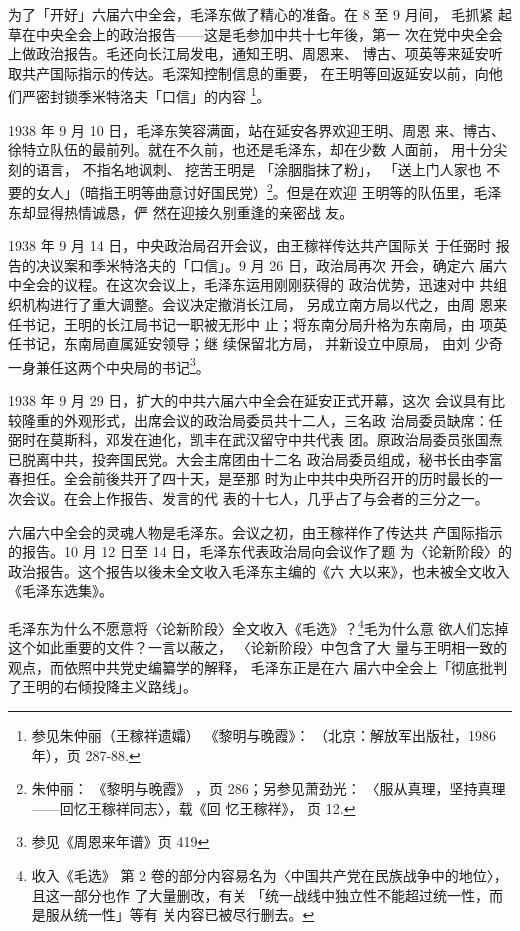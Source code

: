 为了「开好」六届六中全会，毛泽东做了精心的准备。在 8 至 9 月间， 毛抓紧
起草在中央全会上的政治报告——这是毛参加中共十七年後，第一 次在党中央全会
上做政治报告。毛还向长江局发电，通知王明、周恩来、 博古、项英等来延安听
取共产国际指示的传达。毛深知控制信息的重要， 在王明等回返延安以前，向他
们严密封锁季米特洛夫「口信」的内容 \footnote{参见朱仲丽（王稼祥遗孀）
《黎明与晚霞》： （北京：解放军出版社，1986 年），页 287-88.}。

1938 年 9 月 10 日，毛泽东笑容满面，站在延安各界欢迎王明、周恩 来、博古、
徐特立队伍的最前列。就在不久前，也还是毛泽东，却在少数 人面前， 用十分尖
刻的语言， 不指名地讽刺、 挖苦王明是 「涂胭脂抹了粉」， 「送上门人家也
不要的女人」（暗指王明等曲意讨好国民党）\footnote{朱仲丽： 《黎明与晚霞》
，页 286；另参见萧劲光： 〈服从真理，坚持真理——回忆王稼祥同志〉，载《回
忆王稼祥》， 页 12.}。但是在欢迎 王明等的队伍里，毛泽东却显得热情诚恳，俨
然在迎接久别重逢的亲密战 友。

1938 年 9 月 14 日，中央政治局召开会议，由王稼祥传达共产国际关 于任弼时
报告的决议案和季米特洛夫的「口信」。9 月 26 日，政治局再次 开会，确定六
届六中全会的议程。在这次会议上，毛泽东运用刚刚获得的 政治优势，迅速对中
共组织机构进行了重大调整。会议决定撤消长江局， 另成立南方局以代之，由周
恩来任书记，王明的长江局书记一职被无形中 止；将东南分局升格为东南局，由
项英任书记，东南局直属延安领导；继 续保留北方局， 并新设立中原局， 由刘
少奇一身兼任这两个中央局的书记\footnote{参见《周恩来年谱》页 419}。

1938 年 9 月 29 日，扩大的中共六届六中全会在延安正式开幕，这次
会议具有比较隆重的外观形式，出席会议的政治局委员共十二人，三名政
治局委员缺席：任弼时在莫斯科，邓发在迪化，凯丰在武汉留守中共代表
团。原政治局委员张国焘已脱离中共，投奔国民党。大会主席团由十二名
政治局委员组成，秘书长由李富春担任。全会前後共开了四十天，是至那
时为止中共中央所召开的历时最长的一次会议。在会上作报告、发言的代
表的十七人，几乎占了与会者的三分之一。

六届六中全会的灵魂人物是毛泽东。会议之初，由王稼祥作了传达共
产国际指示的报告。10 月 12 日至 14 日，毛泽东代表政治局向会议作了题
为〈论新阶段〉的政治报告。这个报告以後未全文收入毛泽东主编的《六
大以来》，也未被全文收入《毛泽东选集》。
 
毛泽东为什么不愿意将〈论新阶段〉全文收入《毛选》？\footnote{收入《毛选》
第 2 卷的部分内容易名为〈中国共产党在民族战争中的地位〉，且这一部分也作
了大量删改，有关 「统一战线中独立性不能超过统一性，而是服从统一性」等有
关内容已被尽行删去。}毛为什么意 欲人们忘掉这个如此重要的文件？一言以蔽之，
〈论新阶段〉中包含了大 量与王明相一致的观点，而依照中共党史编纂学的解释，
毛泽东正是在六 届六中全会上「彻底批判了王明的右倾投降主义路线」。
 
